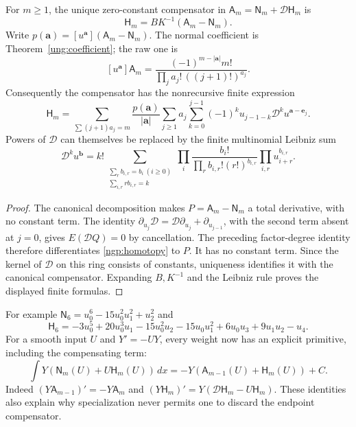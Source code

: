 \begin{theorem}\label{ngp:closed}
For $m\ge1$, the unique zero-constant compensator in
$\mathsf A_m=\mathsf N_m+\mathcal D\mathsf H_m$ is
\begin{equation}\label{ngp:homotopy}
 \boxed{\mathsf H_m=BK^{-1}(\mathsf A_m-\mathsf N_m).}
\end{equation}
Write $p(\boldsymbol a)=[u^{\boldsymbol a}](\mathsf A_m-\mathsf N_m)$.
The normal coefficient is Theorem~\ref{ung:coefficient}; the raw one is
\[
 [u^{\boldsymbol a}]\mathsf A_m
 =\frac{(-1)^{m-|\boldsymbol a|}m!}
 {\prod_j a_j!\,((j+1)!)^{a_j}}.
\]
Consequently the compensator has the nonrecursive finite expression
\begin{equation}\label{ngp:finite}
 \mathsf H_m=
 \sum_{\sum(j+1)a_j=m}\frac{p(\boldsymbol a)}{|\boldsymbol a|}
 \sum_{j\ge1}a_j\sum_{k=0}^{j-1}(-1)^k
                u_{j-1-k}\mathcal D^k u^{\boldsymbol a-\boldsymbol e_j}.
\end{equation}
Powers of $\mathcal D$ can themselves be replaced by the finite
multinomial Leibniz sum
\begin{equation}\label{ngp:leibniz}
 \mathcal D^k u^{\boldsymbol b}
 =k!\sum_{\substack{\sum_r b_{i,r}=b_i\ (i\ge0)\\
                     \sum_{i,r}r b_{i,r}=k}}
  \prod_i\frac{b_i!}{\prod_r b_{i,r}!(r!)^{b_{i,r}}}
  \prod_{i,r}u_{i+r}^{b_{i,r}}.
\end{equation}
\end{theorem}
\begin{proof}
The canonical decomposition makes $P=\mathsf A_m-\mathsf N_m$ a
total derivative, with no constant term. The identity
$\partial_{u_j}\mathcal D=\mathcal D\partial_{u_j}+
\partial_{u_{j-1}}$, with the second term absent at $j=0$, gives
$E(\mathcal DQ)=0$ by cancellation. The preceding factor-degree
identity therefore differentiates \eqref{ngp:homotopy} to $P$.
It has no constant term. Since the kernel of $\mathcal D$ on this
ring consists of constants, uniqueness identifies it with the canonical
compensator. Expanding $B,K^{-1}$ and the Leibniz rule proves the
displayed finite formulas.
\end{proof}

For example $\mathsf N_6=u_0^6-15u_0^2u_1^2+u_2^2$ and
\[
 \mathsf H_6=-3u_0^5+20u_0^3u_1-15u_0^2u_2-15u_0u_1^2
              +6u_0u_3+9u_1u_2-u_4.
\]
For a smooth input $U$ and $Y'=-UY$, every weight now has an explicit
primitive, including the compensating term:
\begin{equation}\label{ngp:weighted}
 \int Y(\mathsf N_m(U)+U\mathsf H_m(U))\,dx
       =-Y(\mathsf A_{m-1}(U)+\mathsf H_m(U))+C.
\end{equation}
Indeed $(Y\mathsf A_{m-1})'=-Y\mathsf A_m$ and
$(Y\mathsf H_m)'=Y(\mathcal D\mathsf H_m-U\mathsf H_m)$.
These identities also explain why specialization never permits one to
discard the endpoint compensator.


